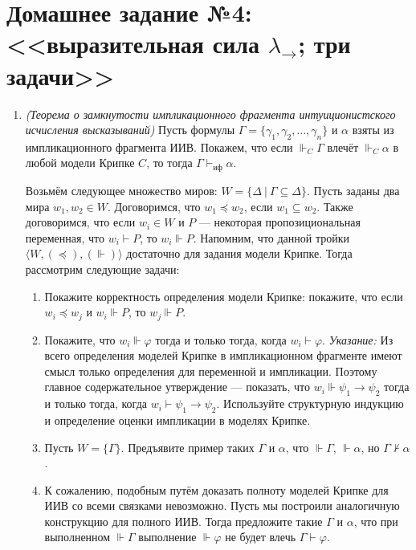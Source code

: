 \documentclass[10pt,a4paper,oneside]{article}
\begin{document}
\section*{Домашнее задание №4: <<выразительная сила $\lambda_\rightarrow$; три задачи>>}
\begin{enumerate}
\item \emph{(Теорема о замкнутости импликационного фрагмента интуиционистского исчисления высказываний)}
Пусть формулы $\Gamma = \{\gamma_1,\gamma_2,\dots,\gamma_n\}$ и $\alpha$ взяты из импликационного
фрагмента ИИВ. Покажем, что если $\Vdash_C \Gamma$ влечёт $\Vdash_C \alpha$ в любой модели Крипке $C$,
то тогда $\Gamma\vdash_\textrm{иф}\alpha$.

Возьмём следующее множество миров: $W = \{ \Delta\ |\ \Gamma\subseteq\Delta \}$.
Пусть заданы два мира $w_1,w_2\in W$. Договоримся, что $w_1 \preceq w_2$, если $w_1 \subseteq w_2$.
Также договоримся, что если $w_i \in W$ и $P$ --- некоторая пропозициональная переменная,
что $w_i \vdash P$, то $w_i \Vdash P$. Напомним, что данной тройки $\langle W, (\preceq), (\Vdash) \rangle$
достаточно для задания модели Крипке. Тогда рассмотрим следующие задачи:

\begin{enumerate}
\item Покажите корректность определения модели Крипке: покажите, что если $w_i \preceq w_j$ и $w_i \Vdash P$,
то $w_j \Vdash P$.
\item Покажите, что $w_i \Vdash \varphi$ тогда и только тогда, когда $w_i \vdash \varphi$. \emph{Указание:} Из всего определения 
моделей Крипке в импликационном фрагменте имеют смысл только определения для переменной и импликации.
Поэтому главное содержательное утверждение --- показать, что $w_i \Vdash \psi_1\rightarrow\psi_2$
тогда и только тогда, когда $w_i \vdash \psi_1\rightarrow\psi_2$. Используйте структурную индукцию и определение оценки импликации
в моделях Крипке.
\item Пусть $W = \{\Gamma\}$. Предъявите пример таких $\Gamma$ и $\alpha$,
что $\Vdash \Gamma$, $\Vdash \alpha$, но $\Gamma\not\vdash\alpha$.
\item К сожалению, подобным путём доказать полноту моделей Крипке для ИИВ со всеми связками невозможно. 
Пусть мы построили аналогичную конструкцию для полного ИИВ. Тогда предложите такие $\Gamma$ и $\alpha$, 
что при выполненном $\Vdash \Gamma$ выполнение $\Vdash \varphi$ не будет влечь $\Gamma \vdash \varphi$.
\end{enumerate}


\end{enumerate}
\end{document}
